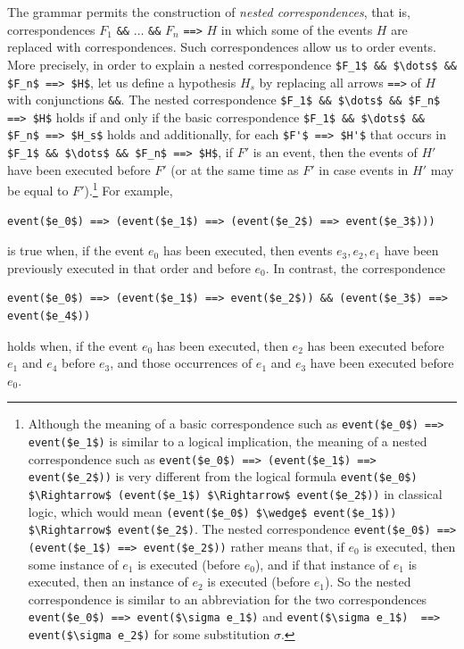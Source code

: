 \documentclass{book}
\begin{document}
The grammar permits the construction of \emph{nested correspondences},
that is, correspondences $F_1$ \lstinline!&&! $\dots$ \lstinline!&&! $F_n$ \lstinline!==>! $H$ in which some of the
events $H$ are replaced with correspondences. Such correspondences
allow us to order events. More precisely, in order to explain a nested
correspondence \lstinline!$F_1$ && $\dots$ && $F_n$ ==> $H$!, let us define a hypothesis $H_s$
by replacing all arrows \lstinline!==>! of $H$ with
conjunctions \lstinline!&&!.
The nested correspondence \lstinline!$F_1$ && $\dots$ && $F_n$ ==> $H$! holds if and only if the basic correspondence \lstinline!$F_1$ && $\dots$ && $F_n$ ==> $H_s$! holds and additionally, for each \lstinline!$F'$ ==> $H'$! that occurs in \lstinline!$F_1$ && $\dots$ && $F_n$ ==> $H$!, if $F'$ is an event, then the events of $H'$ have been executed before $F'$ (or at the same time as $F'$ in case events in $H'$ may be equal to $F'$).\footnote{Although the meaning of a basic correspondence such as \lstinline!event($e_0$) ==> event($e_1$)! is similar to a logical implication, the meaning of a nested correspondence such as \lstinline!event($e_0$) ==> (event($e_1$) ==> event($e_2$))! is very different from the logical formula \lstinline!event($e_0$) $\Rightarrow$ (event($e_1$) $\Rightarrow$ event($e_2$))! in classical logic, which would mean \lstinline!(event($e_0$) $\wedge$ event($e_1$)) $\Rightarrow$ event($e_2$)!. The nested correspondence \lstinline!event($e_0$) ==> (event($e_1$) ==> event($e_2$))! rather means that, if $e_0$ is executed, then some instance of $e_1$ is executed (before $e_0$), and if that instance of $e_1$ is executed, then an instance of $e_2$ is executed (before $e_1$). So the nested correspondence is similar to an abbreviation for the two correspondences \lstinline!event($e_0$) ==> event($\sigma e_1$)! and  \lstinline!event($\sigma e_1$)  ==> event($\sigma e_2$)! for some substitution $\sigma$.}
For example,
%
\begin{lstlisting}[numbers=none]
	event($e_0$) ==> (event($e_1$) ==> (event($e_2$) ==> event($e_3$)))
\end{lstlisting}
%
is true when, if the event $e_0$ has been executed, then events $e_3,e_2,e_1$ have been previously executed in that order and before $e_0$. In contrast, the correspondence
%
\begin{lstlisting}[numbers=none]
	event($e_0$) ==> (event($e_1$) ==> event($e_2$)) && (event($e_3$) ==> event($e_4$))
\end{lstlisting}
%
holds when, if the event $e_0$ has been executed, then $e_2$ has been executed before $e_1$ and $e_4$ before $e_3$, and those occurrences of $e_1$ and $e_3$ have been executed before $e_0$.
\end{document}
